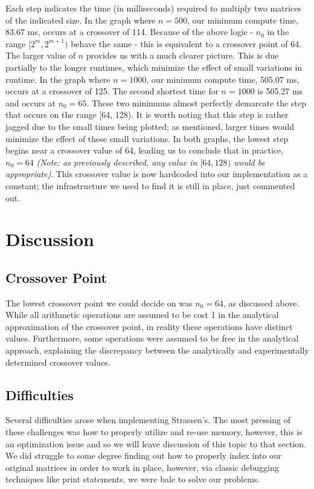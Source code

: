 \documentclass[solution, letterpaper]{cs121}
\begin{document}
Each step indicates the time (in milliseconds) required to multiply two matrices of the indicated size. In the graph where $n=500$, our minimum compute time, 83.67 ms, occurs at a crossover of 114. Because of the above logic - $n_0$ in the range $[2^m,2^{m+1})$ behave the same - this is equivalent to a crossover point of 64. The larger value of $n$ provides us with a much clearer picture. This is due partially to the longer runtimes, which minimize the effect of small variations in runtime. In the graph where $n=1000$, our minimum compute time, 505.07 ms, occurs at a crossover of 125. The second shortest time for $n = 1000$ is 505.27 ms and occurs at $n_0 = 65$. These two minimums almost perfectly demarcate the step that occurs on the range [64, 128). It is worth noting that this step is rather jagged due to the small times being plotted; as mentioned, larger times would minimize the effect of these small variations. In both graphs, the lowest step begins near a crossover value of 64, leading us to conclude that in practice, $n_0 = 64$ \textit{(Note: as previously described, any value in $[64,128)$ would be appropriate)}. This crossover value is now hardcoded into our implementation as a constant; the infrastructure we used to find it is still in place, just commented out.

\section*{Discussion}

\subsection*{Crossover Point}
\hspace{4mm} The lowest crossover point we could decide on was $n_0 = 64$, as discussed above. While all arithmetic operations are assumed to be cost 1 in the analytical approximation of the crossover point, in reality these operations have distinct values. Furthermore, some operations were assumed to be free in the analytical approach, explaining the discrepancy between the analytically and experimentally determined crossover values.

\subsection*{Difficulties}
\hspace{4mm} Several difficulties arose when implementing Strassen's. The most pressing of these challenges was how to properly utilize and re-use memory, however, this is an optimization issue and so we will leave discussion of this topic to that section. We did struggle to some degree finding out how to properly index into our original matrices in order to work in place, however, via classic debugging techniques like print statements, we were bale to solve our problems.
\end{document}
